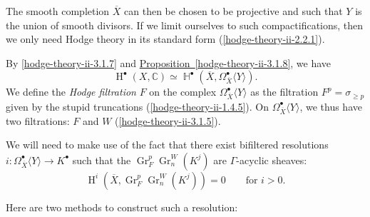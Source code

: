     The smooth completion \(\overline {X}\) can then be chosen to be projective and such that \(Y\) is the union of smooth divisors.
    If we limit ourselves to such compactifications, then we only need Hodge theory in its standard form (\cref{hodge-theory-ii-2.2.1}).\label{hodge-theory-ii-3.2.2}\par{}By \cref{hodge-theory-ii-3.1.7} and \hyperref[hodge-theory-ii-3.1.8]{Proposition~\ref*{hodge-theory-ii-3.1.8}}, we have
    \[       \operatorname {H}^\bullet (X,\mathbb {C})       \simeq  \operatorname {\mathbb {H}}^\bullet (\overline {X},\Omega _{\overline {X}}^\bullet \langle  Y\rangle ).     \]
    We define the \emph{Hodge filtration} \(F\) on the complex \(\Omega _{\overline {X}}^\bullet \langle  Y\rangle \) as the filtration \(F^p=\sigma _{\geqslant  p}\) given by the stupid truncations (\cref{hodge-theory-ii-1.4.5}).
    On \(\Omega _{\overline {X}}^\bullet \langle  Y\rangle \), we thus have two filtrations: \(F\) and \(W\) (\cref{hodge-theory-ii-3.1.5}).\label{hodge-theory-ii-3.2.3}\par{}We will need to make use of the fact that there exist bifiltered resolutions \(i\colon \Omega _{\overline {X}}^\bullet \langle  Y\rangle \to  K^\bullet \) such that the \(\operatorname {Gr}_F^p\operatorname {Gr}_n^W(K^j)\) are \(\Gamma \)-acyclic sheaves:
    \[       \operatorname {H}^i(\overline {X},\operatorname {Gr}_F^p\operatorname {Gr}_n^W(K^j))       = 0       \qquad \text {for }i>0.     \]\par{}Here are two methods to construct such a resolution:

